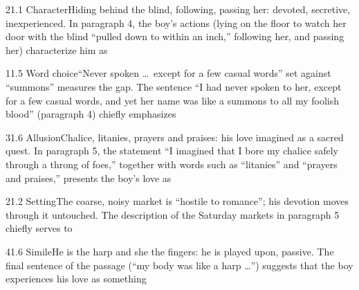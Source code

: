 \documentclass[11pt]{article}
\begin{document}
\begin{q}{2}{1.1 Character}{Hiding behind the blind, following, passing her: devoted, secretive, inexperienced.}
In paragraph 4, the boy's actions (lying on the floor to watch her door with the blind ``pulled down to within an inch,'' following her, and passing her) characterize him as
\end{q}

\begin{q}{1}{1.5 Word choice}{``Never spoken \ldots\ except for a few casual words'' set against ``summons'' measures the gap.}
The sentence ``I had never spoken to her, except for a few casual words, and yet her name was like a summons to all my foolish blood'' (paragraph 4) chiefly emphasizes
\end{q}

\begin{q}{3}{1.6 Allusion}{Chalice, litanies, prayers and praises: his love imagined as a sacred quest.}
In paragraph 5, the statement ``I imagined that I bore my chalice safely through a throng of foes,'' together with words such as ``litanies'' and ``prayers and praises,'' presents the boy's love as
\end{q}

\begin{q}{2}{1.2 Setting}{The coarse, noisy market is ``hostile to romance''; his devotion moves through it untouched.}
The description of the Saturday markets in paragraph 5 chiefly serves to
\end{q}

\begin{q}{4}{1.6 Simile}{He is the harp and she the fingers: he is played upon, passive.}
The final sentence of the passage (``my body was like a harp \ldots'') suggests that the boy experiences his love as something
\end{q}
\end{document}
